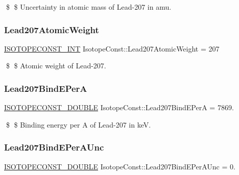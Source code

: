 \$ \$ Uncertainty in atomic mass of Lead-\/207 in amu. \mbox{\label{group___isotope_const-_lead-_pb207_gaf5004bd180b814df789467477bb3e560}} 
\subsubsection{\texorpdfstring{Lead207\+Atomic\+Weight}{Lead207AtomicWeight}}
{\footnotesize\ttfamily \mbox{\hyperlink{group___isotope_const-_macros_ga5f18360b3e99483a35c32d789e62621c}{I\+S\+O\+T\+O\+P\+E\+C\+O\+N\+S\+T\+\_\+\+I\+NT}} Isotope\+Const\+::\+Lead207\+Atomic\+Weight = 207}

\$ \$ Atomic weight of Lead-\/207. \mbox{\label{group___isotope_const-_lead-_pb207_ga368a8120e126723cbcd1dd09bf1abbd7}} 
\subsubsection{\texorpdfstring{Lead207\+Bind\+E\+PerA}{Lead207BindEPerA}}
{\footnotesize\ttfamily \mbox{\hyperlink{group___isotope_const-_macros_ga8f45a7272ce02c0b4c65c44636ed719a}{I\+S\+O\+T\+O\+P\+E\+C\+O\+N\+S\+T\+\_\+\+D\+O\+U\+B\+LE}} Isotope\+Const\+::\+Lead207\+Bind\+E\+PerA = 7869.}

\$ \$ Binding energy per A of Lead-\/207 in keV. \mbox{\label{group___isotope_const-_lead-_pb207_ga229fb038786537d815d4e1d94e62d035}} 
\subsubsection{\texorpdfstring{Lead207\+Bind\+E\+Per\+A\+Unc}{Lead207BindEPerAUnc}}
{\footnotesize\ttfamily \mbox{\hyperlink{group___isotope_const-_macros_ga8f45a7272ce02c0b4c65c44636ed719a}{I\+S\+O\+T\+O\+P\+E\+C\+O\+N\+S\+T\+\_\+\+D\+O\+U\+B\+LE}} Isotope\+Const\+::\+Lead207\+Bind\+E\+Per\+A\+Unc = 0.}

